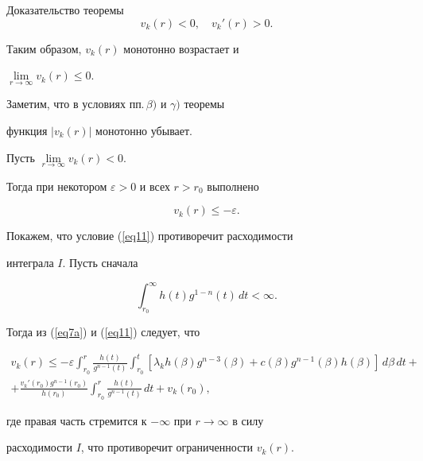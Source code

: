 \begin{pf*}{Доказательство теоремы}
\begin{equation}
v_k(r)<0,\quad v_k'(r)>0.


\label{eq10}


\end{equation}


Таким образом, $v_k(r)$ монотонно возрастает и


$\lim\limits_{r\to\infty}v_k(r)\le 0$.


Заметим, что в условиях пп.\,$\beta)$ и $\gamma)$ теоремы


функция $|v_k(r)|$ монотонно убывает.





Пусть $\lim\limits_{r\to\infty}v_k(r)<0$.


Тогда при некотором $\varepsilon>0$ и всех $r>r_0$ выполнено


\begin{equation}


v_k(r)\le -\varepsilon.


\label{eq11}


\end{equation}


Покажем, что условие (\ref{eq11}) противоречит расходимости


интеграла $I$. Пусть сначала


$$


\int_{r_0}^{\infty} h(t)g^{1-n}(t)\,dt<\infty.


$$


Тогда из (\ref{eq7a}) и (\ref{eq11}) следует, что


\begin{multline*}


v_k(r)\le -\varepsilon\int_{r_0}^r\frac{h(t)}{g^{n-1}(t)}


\int_{r_0}^t[\lambda_k h(\beta)g^{n-3}(\beta)+


c(\beta)g^{n-1}(\beta)h(\beta)]\,d\beta\,dt+\\


%


+\frac{v_k'(r_0)g^{n-1}(r_0)}{h(r_0)}\int_{r_0}^r \frac{h(t)}{g^{n-1}


(t)}\,dt+v_k(r_0),


\end{multline*}


где правая часть стремится к $-\infty$ при $r\to \infty$ в силу


расходимости $I$, что противоречит ограниченности $v_k(r)$.






\end{pf*}
